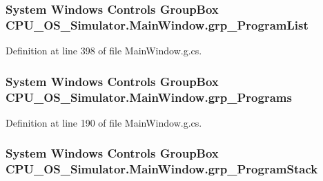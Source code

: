 \subsubsection[{grp\+\_\+\+Program\+List}]{\setlength{\rightskip}{0pt plus 5cm}System Windows Controls Group\+Box C\+P\+U\+\_\+\+O\+S\+\_\+\+Simulator.\+Main\+Window.\+grp\+\_\+\+Program\+List\hspace{0.3cm}{\ttfamily [package]}}\label{class_c_p_u___o_s___simulator_1_1_main_window_a0ccd227c10c9a0878095ef10c0ff92b7}


Definition at line 398 of file Main\+Window.\+g.\+cs.

\hypertarget{class_c_p_u___o_s___simulator_1_1_main_window_a2cafe5a8b54ae3e95a770abc594519a0}{}
\subsubsection[{grp\+\_\+\+Programs}]{\setlength{\rightskip}{0pt plus 5cm}System Windows Controls Group\+Box C\+P\+U\+\_\+\+O\+S\+\_\+\+Simulator.\+Main\+Window.\+grp\+\_\+\+Programs\hspace{0.3cm}{\ttfamily [package]}}\label{class_c_p_u___o_s___simulator_1_1_main_window_a2cafe5a8b54ae3e95a770abc594519a0}


Definition at line 190 of file Main\+Window.\+g.\+cs.

\hypertarget{class_c_p_u___o_s___simulator_1_1_main_window_a10687b397ff3a0381a556096a14ed0b0}{}
\subsubsection[{grp\+\_\+\+Program\+Stack}]{\setlength{\rightskip}{0pt plus 5cm}System Windows Controls Group\+Box C\+P\+U\+\_\+\+O\+S\+\_\+\+Simulator.\+Main\+Window.\+grp\+\_\+\+Program\+Stack\hspace{0.3cm}{\ttfamily [package]}}\label{class_c_p_u___o_s___simulator_1_1_main_window_a10687b397ff3a0381a556096a14ed0b0}



